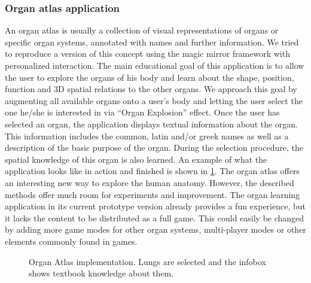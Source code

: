\subsubsection{Organ atlas application}
An organ atlas is usually a collection of visual representations of organs or specific organ systems, annotated with names and further information.
We tried to reproduce a version of this concept using the magic mirror framework with personalized interaction. The main educational goal of this application is to allow the user to explore the organs of his body and learn about the shape, position, function and 3D spatial relations to the other organs.
We approach this goal by augmenting all available organs onto a user's body and letting the user select the one he/she is interested in via ``Organ Explosion'' effect. Once the user has selected an organ, the application displays textual information about the organ. This information includes the common, latin and/or greek names as well as a description of the basic purpose of the organ. During the selection procedure, the spatial knowledge of this organ is also learned. An example of what the application looks like in action and finished is shown in \figurename{\ref{fig:3-IMR:OrganAtlas}}. The organ atlas offers an interesting new way to explore the human anatomy. However, the described methods offer much room for experiments and improvement. The organ learning application in its current prototype version already provides a fun experience, but it lacks the content to be distributed as a full game. This could easily be changed by adding more game modes for other organ systems, multi-player modes or other elements commonly found in games.
\begin{figure}
\centering
{}
\caption{Organ Atlas implementation. Lungs are selected and the infobox shows textbook knowledge about them.}
\label{fig:3-IMR:OrganAtlas}
\end{figure}

